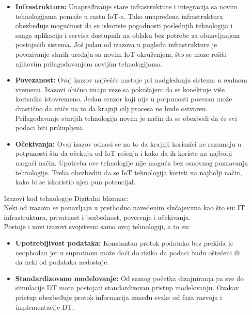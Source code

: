 \documentclass[a4paper]{article}
\begin{document}
{\begin{itemize}
podataka, voditi računa da oni budu sortirani i organizovani, što će rezultirati time da veća
količina podataka bude iskoristiva i da ima neku vrednost.\cite{enablingtechnologies}
\item \textbf{Infrastruktura:} Unapređivanje stare infrastrukture i integracija sa novim tehnologijama
pomaže u rastu IoT-a. Tako unapređena infrastruktura obezbeđuje mogućnost da se iskoriste
pogodnosti poslednjih tehnologija i snaga aplikacija i servisa dostupnih na oblaku bez potrebe
za obnavljanjem postojećih sistema. Još jedan od izazova u pogledu infrastrukture je povezivanje
starih uređaja sa novim IoT okruženjem, što se moze rešiti njihovim prilagođavanjem novijim
tehnologijama.\cite{enablingtechnologies}
\item \textbf{Povezanost:} Ovaj izazov najčešće nastaje pri nadgledanju sistema u realnom vremenu. Izazovi
obično imaju veze sa pokušajem da se konektuje više korisnika istovremeno. Jedan senzor koji
nije u potpunosti povezan može drastično da utiče na to da krajnji cilj procesa ne bude ostvaren.
Prilagođavanje starijih tehnologija novim je način da se obezbedi da će svi podaci biti
prikupljeni. \cite{enablingtechnologies}
\item \textbf{Očekivanja:} Ovaj izazov odnosi se na to da krajnji korisnici ne razumeju u potpunosti šta da
očekuju od IoT rešenja i kako da ih koriste na najbolji mogući način. Upotreba ove tehnologije
nije moguća bez osnovnog poznavanja tehnologije. Treba obezbediti da se IoT tehnologija
koristi na najbolji način, kako bi se iskoristio njen pun potencijal. \cite{enablingtechnologies}
\end{itemize}

Izazovi kod tehnologije Digitalni blizanac:\\ Neki od izazova se ponavljaju u prethodno navedenim slučajevima kao što su: IT infrastruktura,
privatnost i bezbednost, poverenje i očekivanja.\\
Postoje i novi izazovi svojstveni samo ovoj tehnologiji, a to su:
\begin{itemize}
\item \textbf{Upotrebljivost podataka:} Konstantan protok podataka bez prekida je neophodan jer u
suprotnom može doći do rizika da podaci budu oštećeni ili da neki od podataka nedostaje. \cite{enablingtechnologies}
\item \textbf{Standardizovano modelovanje:} Od samog početka dizajniranja pa sve do simulacije DT mora postojati standardizovan pristup modelovanju. Ovakav pristup obezbeđuje protok
informacija između svake od faza razvoja i implementacije DT. \cite{enablingtechnologies}
\end{itemize}

}
\end{document}
